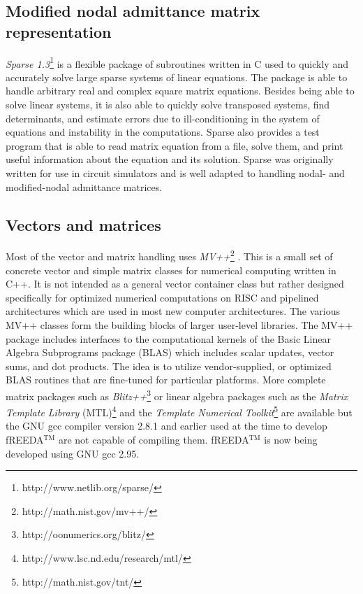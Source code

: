 \subsection{Modified nodal admittance matrix representation} 

\emph{Sparse 1.3}\footnote{http://www.netlib.org/sparse/}
\cite{Sparse} is a flexible package of subroutines written in C used
to quickly and accurately solve large sparse systems of linear
equations.  The package is able to handle arbitrary real and complex
square matrix equations.  Besides being able to solve linear systems,
it is also able to quickly solve transposed systems, find
determinants, and estimate errors due to ill-conditioning in the
system of equations and instability in the computations.  Sparse also
provides a test program that is able to read matrix equation from a
file, solve them, and print useful information about the equation and
its solution. Sparse was originally written for use in circuit
simulators and is well adapted to handling nodal- and modified-nodal
admittance matrices.

\subsection{Vectors and matrices}

Most of the vector and matrix handling uses
\emph{MV++}\footnote{http://math.nist.gov/mv++/} \cite{mv++}.  This is
a small set of concrete vector and simple matrix classes for numerical
computing written in C++. It is not intended as a general vector
container class but rather designed specifically for optimized
numerical computations on RISC and pipelined architectures which are
used in most new computer architectures. The various MV++ classes form
the building blocks of larger user-level libraries.  The MV++ package
includes interfaces to the computational kernels of the Basic Linear
Algebra Subprograms package (BLAS) which includes scalar updates,
vector sums, and dot products. The idea is to utilize vendor-supplied,
or optimized BLAS routines that are fine-tuned for particular
platforms. More complete matrix packages such as
\emph{Blitz++}\footnote{http://oonumerics.org/blitz/} or linear
algebra packages such as the \emph{Matrix Template Library}
(MTL)\footnote{http://www.lsc.nd.edu/research/mtl/} and the
\emph{Template Numerical Toolkit}\footnote{http://math.nist.gov/tnt/}
are available but the GNU gcc compiler version 2.8.1 and earlier used
at the time to develop fREEDA$^{\mathrm{TM}}$ are not capable of compiling
them. fREEDA$^{\mathrm{TM}}$ is now being developed using GNU gcc 2.95.


